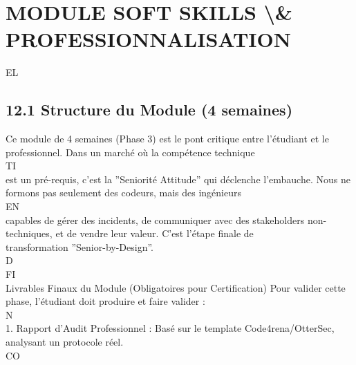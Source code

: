 \section{MODULE SOFT SKILLS \textbackslash{}& PROFESSIONNALISATION}
\vspace{0.5em}
\vspace{0.5em}
\vspace{0.5em}
\vspace{0.5em}
EL\\
\subsection{12.1 Structure du Module (4 semaines)}
Ce module de 4 semaines (Phase 3) est le pont critique entre l’étudiant et le professionnel. Dans un marché où la compétence technique\\
\vspace{0.5em}
\vspace{0.5em}
\vspace{0.5em}
\vspace{0.5em}
TI\\
est un pré-requis, c’est la ”Seniorité Attitude” qui déclenche l’embauche. Nous ne formons pas seulement des codeurs, mais des ingénieurs\\
\vspace{0.5em}
\vspace{0.5em}
\vspace{0.5em}
\vspace{0.5em}
EN\\
capables de gérer des incidents, de communiquer avec des stakeholders non-techniques, et de vendre leur valeur. C’est l’étape finale de\\
transformation ”Senior-by-Design”.\\
\vspace{0.5em}
\vspace{0.5em}
\vspace{0.5em}
\vspace{0.5em}
D\\
FI\\
Livrables Finaux du Module (Obligatoires pour Certification)        Pour valider cette phase, l’étudiant doit produire et faire valider :\\
\vspace{0.5em}
N\\
1. Rapport d’Audit Professionnel : Basé sur le template Code4rena/OtterSec, analysant un protocole réel.\\
CO\\
